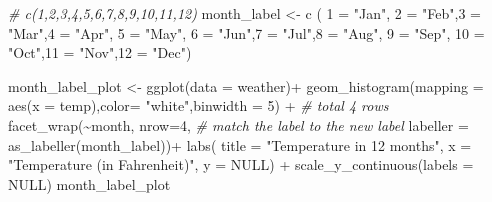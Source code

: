 \documentclass[
]{article}
\newenvironment{Shaded}{\begin{snugshade}}{\end{snugshade}}
\newcommand{\AttributeTok}[1]{\textcolor[rgb]{0.77,0.63,0.00}{#1}}
\newcommand{\CommentTok}[1]{\textcolor[rgb]{0.56,0.35,0.01}{\textit{#1}}}
\newcommand{\ConstantTok}[1]{\textcolor[rgb]{0.00,0.00,0.00}{#1}}
\newcommand{\DecValTok}[1]{\textcolor[rgb]{0.00,0.00,0.81}{#1}}
\newcommand{\FunctionTok}[1]{\textcolor[rgb]{0.00,0.00,0.00}{#1}}
\newcommand{\NormalTok}[1]{#1}
\newcommand{\OtherTok}[1]{\textcolor[rgb]{0.56,0.35,0.01}{#1}}
\newcommand{\SpecialCharTok}[1]{\textcolor[rgb]{0.00,0.00,0.00}{#1}}
\newcommand{\StringTok}[1]{\textcolor[rgb]{0.31,0.60,0.02}{#1}}
\begin{document}
\begin{Shaded}
\begin{Highlighting}[]
\CommentTok{\# c(1,2,3,4,5,6,7,8,9,10,11,12)}
\NormalTok{month\_label }\OtherTok{\textless{}{-}} \FunctionTok{c}\NormalTok{ (}
                \StringTok{\textquotesingle{}1\textquotesingle{}} \OtherTok{=} \StringTok{"Jan"}\NormalTok{, }\StringTok{\textquotesingle{}2\textquotesingle{}} \OtherTok{=} \StringTok{"Feb"}\NormalTok{,}\StringTok{\textquotesingle{}3\textquotesingle{}} \OtherTok{=} \StringTok{"Mar"}\NormalTok{,}\StringTok{\textquotesingle{}4\textquotesingle{}} \OtherTok{=} \StringTok{"Apr"}\NormalTok{,}
                \StringTok{\textquotesingle{}5\textquotesingle{}} \OtherTok{=} \StringTok{"May"}\NormalTok{, }\StringTok{\textquotesingle{}6\textquotesingle{}} \OtherTok{=} \StringTok{"Jun"}\NormalTok{,}\StringTok{\textquotesingle{}7\textquotesingle{}} \OtherTok{=} \StringTok{"Jul"}\NormalTok{,}\StringTok{\textquotesingle{}8\textquotesingle{}} \OtherTok{=} \StringTok{"Aug"}\NormalTok{,}
                \StringTok{\textquotesingle{}9\textquotesingle{}} \OtherTok{=} \StringTok{"Sep"}\NormalTok{, }\StringTok{\textquotesingle{}10\textquotesingle{}} \OtherTok{=} \StringTok{"Oct"}\NormalTok{,}\StringTok{\textquotesingle{}11\textquotesingle{}} \OtherTok{=} \StringTok{"Nov"}\NormalTok{,}\StringTok{\textquotesingle{}12\textquotesingle{}} \OtherTok{=} \StringTok{"Dec"}\NormalTok{)}


\NormalTok{month\_label\_plot }\OtherTok{\textless{}{-}} \FunctionTok{ggplot}\NormalTok{(}\AttributeTok{data =}\NormalTok{ weather)}\SpecialCharTok{+}
  \FunctionTok{geom\_histogram}\NormalTok{(}\AttributeTok{mapping =} \FunctionTok{aes}\NormalTok{(}\AttributeTok{x =}\NormalTok{ temp),}\AttributeTok{color=} \StringTok{"white"}\NormalTok{,}\AttributeTok{binwidth =} \DecValTok{5}\NormalTok{) }\SpecialCharTok{+}
  \CommentTok{\# total 4 rows}
  \FunctionTok{facet\_wrap}\NormalTok{(}\SpecialCharTok{\textasciitilde{}}\NormalTok{month,}
             \AttributeTok{nrow=}\DecValTok{4}\NormalTok{,}
             \CommentTok{\# match the label to the new label}
             \AttributeTok{labeller =} \FunctionTok{as\_labeller}\NormalTok{(month\_label))}\SpecialCharTok{+} 
  \FunctionTok{labs}\NormalTok{(}
      \AttributeTok{title =} \StringTok{"Temperature in 12 months"}\NormalTok{,}
      \AttributeTok{x =} \StringTok{"Temperature (in Fahrenheit)"}\NormalTok{,}
      \AttributeTok{y =} \ConstantTok{NULL}\NormalTok{) }\SpecialCharTok{+} 
      \FunctionTok{scale\_y\_continuous}\NormalTok{(}\AttributeTok{labels =} \ConstantTok{NULL}\NormalTok{) }
\NormalTok{month\_label\_plot}
\end{Highlighting}
\end{Shaded}
\end{document}
